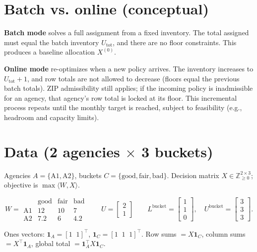 \documentclass[11pt]{article}
\begin{document}

\section*{Batch vs. online (conceptual)}
\textbf{Batch mode} solves a full assignment from a fixed inventory. The total assigned
must equal the batch inventory $U_{\mathrm{tot}}$, and there are no floor constraints.
This produces a baseline allocation $X^{(0)}$.

\textbf{Online mode} re-optimizes when a new policy arrives. The inventory increases to
$U_{\mathrm{tot}}+1$, and row totals are not allowed to decrease (floors equal the
previous batch totals). ZIP admissibility still applies; if the incoming policy is
inadmissible for an agency, that agency's row total is locked at its floor. This
incremental process repeats until the monthly target is reached, subject to feasibility
(e.g., headroom and capacity limits).

\section*{Data (2 agencies $\times$ 3 buckets)}
Agencies $A=\{\mathrm{A1},\mathrm{A2}\}$, buckets $C=\{\mathrm{good},\mathrm{fair},\mathrm{bad}\}$.
Decision matrix $X\in\mathbb{Z}_{\ge 0}^{2\times 3}$; objective is $\max\langle W,X\rangle$.

\[
W=
\begin{array}{c|ccc}
 & \text{good} & \text{fair} & \text{bad} \\\hline
\text{A1} & 12   & 10 & 7 \\
\text{A2} & 7.2  & 6  & 4.2
\end{array}
\qquad
U=
\begin{bmatrix}
2\\[2pt]1
\end{bmatrix}
\qquad
L^{\text{bucket}}=\begin{bmatrix}1\\[2pt]1\\[2pt]0\end{bmatrix},\quad
U^{\text{bucket}}=\begin{bmatrix}3\\[2pt]3\\[2pt]3\end{bmatrix}.
\]

Ones vectors: $\mathbf{1}_A=[1\;\;1]^\top$, $\mathbf{1}_C=[1\;\;1\;\;1]^\top$.  
Row sums $=X\mathbf{1}_C$, column sums $=X^\top\mathbf{1}_A$, global total $=\mathbf{1}_A^\top X \mathbf{1}_C$.
\end{document}
